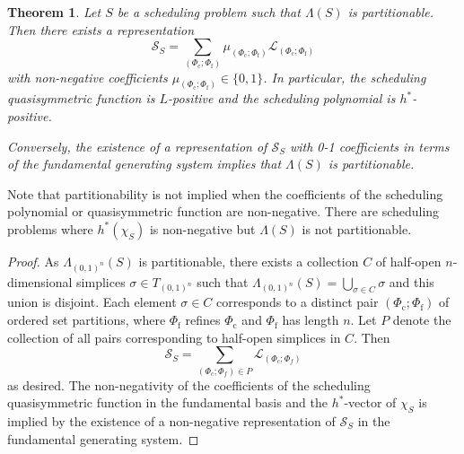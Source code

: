 \documentclass[12pt,reqno]{amsart}
\numberwithin{definition}{section}
\newtheorem{theorem}[definition]{Theorem}
\theoremstyle{definition}
\newcommand{\SSS}{\mathcal{S}}
\newcommand{\ncL}{\mathcal{L}}
\newcommand{\T}{T} %
\newcommand{\TC}{\T_{(0,1)^n}} %
\newcommand{\allow}{\Lambda} %
\newcommand{\poly}{\chi} %
\newcommand{\allowC}{\allow_{(0,1)^n}} %
\newcommand{\comment}[1]{\textsf{\footnotesize #1}}
\begin{document}


\begin{theorem}
\label{thm:part-pos}
Let $S$ be a scheduling problem such that $\allow(S)$ is partitionable. Then there exists a representation
\[
  \SSS_S = \sum_{(\Phi_\text{c};\Phi_\text{f})} \mu_{(\Phi_\text{c};\Phi_\text{f})} \ncL_{(\Phi_\text{c};\Phi_\text{f})}
\]
with non-negative coefficients $\mu_{(\Phi_\text{c};\Phi_\text{f})}\in \{0,1\}$. In particular, 
the scheduling quasisymmetric function is $L$-positive and the scheduling polynomial is $h^*$-positive.

Conversely, the existence of a representation of $\SSS_S$ with 0-1 coefficients in terms of the fundamental generating system implies that $\allow(S)$ is partitionable. 
\end{theorem}

Note that partitionability is not implied when the coefficients of the scheduling polynomial or quasisymmetric function are non-negative. There are scheduling problems where $h^*(\poly_S)$ is non-negative but $\allow(S)$ is not partitionable.

\begin{proof}
As $\allowC(S)$ is partitionable, there exists a collection $C$ of half-open $n$-dimensional simplices $\sigma\in\TC$ such that $\allowC(S)=\bigcup_{\sigma\in C}\sigma$ and this union is disjoint. Each element $\sigma\in C$ corresponds to a distinct pair $(\Phi_\text{c};\Phi_\text{f})$ of ordered set partitions, where $\Phi_\text{f}$ refines $\Phi_\text{c}$ and $\Phi_\text{f}$ has length $n$. Let $P$ denote the collection of all pairs corresponding to half-open simplices in $C$. Then
\[
  \SSS_S = \sum_{(\Phi_c;\Phi_f)\in P} \ncL_{(\Phi_c;\Phi_f)}
\]
as desired. The non-negativity of the coefficients of the scheduling quasisymmetric function in the fundamental basis and the $h^*$-vector of $\poly_S$ is implied by the existence of a non-negative representation of $\SSS_S$ in the fundamental generating system.
\end{proof}
\end{document}
